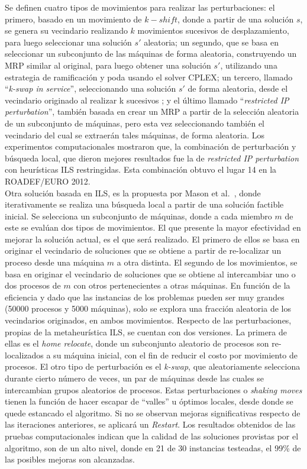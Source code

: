 \documentclass[../informe2.tex]{subfiles}
\begin{document}
Se definen cuatro tipos de movimientos para realizar las perturbaciones:
el primero, basado en un movimiento de $k-shift$, donde a partir de una solución $s$, se genera su vecindario realizando $k$ movimientos sucesivos de desplazamiento, para luego seleccionar una solución $s'$ aleatoria; un segundo, que se basa en seleccionar un subconjunto de las máquinas de forma aleatoria, construyendo un MRP similar al original, para luego obtener una solución $s'$, utilizando una estrategia de ramificación y poda usando el solver CPLEX; un tercero, llamado ``\textit{k-swap in service}'', seleccionando una solución $s'$ de forma aleatoria, desde el vecindario originado al realizar k sucesivos ; y el último llamado ``\textit{restricted IP perturbation}'', también basada en crear un MRP a partir de la selección aleatoria de un subconjunto de máquinas, pero esta vez seleccionando también el vecindario del cual se extraerán tales máquinas, de forma aleatoria.
Los experimentos computacionales mostraron que, la combinación de perturbación y búsqueda local, que dieron mejores resultados fue la de \textit{restricted IP perturbation} con heurísticas ILS restringidas. Esta combinación obtuvo el lugar 14 en la ROADEF/EURO 2012. \\

Otra solución basada en ILS, es la propuesta por Mason et al.~\cite{masson2013iterated}, donde iterativamente se realiza una búsqueda local a partir de una solución factible inicial. Se selecciona un subconjunto de máquinas, donde a cada miembro $m$ de este se evalúan dos tipos de movimientos. El que presente la mayor efectividad en mejorar la solución actual, es el que será realizado. El primero de ellos se basa en originar el vecindario de soluciones que se obtiene a partir de re-localizar un proceso desde una máquina $m$ a otra distinta. El segundo de los movimientos, se basa en originar el vecindario de soluciones que se obtiene al intercambiar uno o dos procesos de $m$ con otros pertenecientes a otras máquinas. En función de la eficiencia y dado que las instancias de los problemas pueden ser muy grandes (50000 procesos y 5000 máquinas), solo se explora una fracción aleatoria de los vecindarios originados, en ambos movimientos.
Respecto de las perturbaciones, propias de la metaheurística ILS, se cuentan con dos versiones. La primera de ellas es el \textit{home relocate}, donde un subconjunto aleatorio de procesos son re-localizados a su máquina inicial, con el fin de reducir el costo por movimiento de procesos. El otro tipo de perturbación es el \textit{k-swap}, que aleatoriamente selecciona durante cierto número de veces, un par de máquinas desde las cuales se intercambian grupos aleatorios de procesos. Estas perturbaciones o \textit{shaking moves} tienen la función de hacer escapar de ``valles'' u óptimos locales, desde donde se quede estancado el algoritmo. Si no se observan mejoras significativas respecto de las iteraciones anteriores, se aplicará un \textit{Restart}. Los resultados obtenidos de las pruebas computacionales indican que la calidad de las soluciones provistas por el algoritmo, son de un alto nivel, donde en 21 de 30 instancias testeadas, el 99\% de las posibles mejoras son alcanzadas. \\
\end{document}
